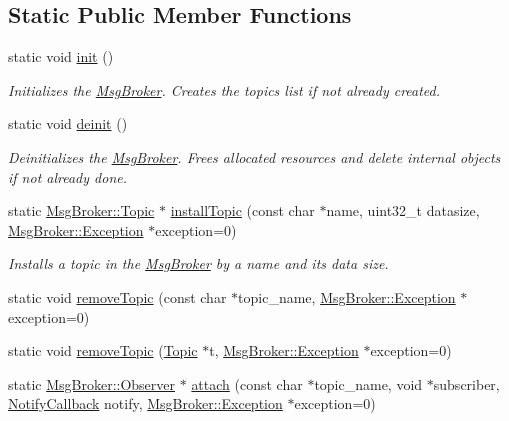 \subsection*{Static Public Member Functions}
\begin{DoxyCompactItemize}
\item 
static void \hyperlink{class_msg_broker_acb4b2f7ac02b15cbd3b63442347c421e}{init} ()
\begin{DoxyCompactList}\small\item\em Initializes the \hyperlink{class_msg_broker}{Msg\-Broker}. Creates the topics list if not already created. \end{DoxyCompactList}\item 
static void \hyperlink{class_msg_broker_a17802a78defce9c29e23dd95d385b600}{deinit} ()
\begin{DoxyCompactList}\small\item\em Deinitializes the \hyperlink{class_msg_broker}{Msg\-Broker}. Frees allocated resources and delete internal objects if not already done. \end{DoxyCompactList}\item 
static \hyperlink{struct_msg_broker_1_1_topic}{Msg\-Broker\-::\-Topic} $\ast$ \hyperlink{class_msg_broker_adf353e158ae2e4511fe02dbaaf4f7c3b}{install\-Topic} (const char $\ast$name, uint32\-\_\-t datasize, \hyperlink{class_msg_broker_a29a59609f9ec3a1b8022f98f228f3c9c}{Msg\-Broker\-::\-Exception} $\ast$exception=0)
\begin{DoxyCompactList}\small\item\em Installs a topic in the \hyperlink{class_msg_broker}{Msg\-Broker} by a name and its data size. \end{DoxyCompactList}\item 
static void \hyperlink{class_msg_broker_a252f90534758da546b9f141401b15663}{remove\-Topic} (const char $\ast$topic\-\_\-name, \hyperlink{class_msg_broker_a29a59609f9ec3a1b8022f98f228f3c9c}{Msg\-Broker\-::\-Exception} $\ast$exception=0)
\item 
static void \hyperlink{class_msg_broker_a879ff94ddf4ddf4d7e5dfdeef9229cab}{remove\-Topic} (\hyperlink{struct_msg_broker_1_1_topic}{Topic} $\ast$t, \hyperlink{class_msg_broker_a29a59609f9ec3a1b8022f98f228f3c9c}{Msg\-Broker\-::\-Exception} $\ast$exception=0)
\item 
static \hyperlink{struct_msg_broker_1_1_observer}{Msg\-Broker\-::\-Observer} $\ast$ \hyperlink{class_msg_broker_af1896b563403cebee55d618c782651b4}{attach} (const char $\ast$topic\-\_\-name, void $\ast$subscriber, \hyperlink{class_msg_broker_a830cd79418898c03e6b144b1e47d68d1}{Notify\-Callback} notify, \hyperlink{class_msg_broker_a29a59609f9ec3a1b8022f98f228f3c9c}{Msg\-Broker\-::\-Exception} $\ast$exception=0)

\end{DoxyCompactItemize}
